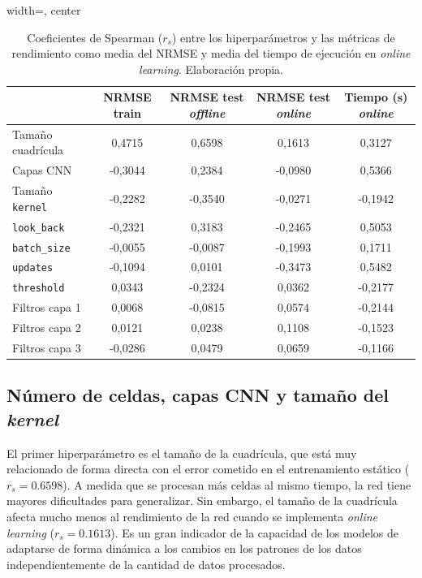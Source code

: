 \begin{table}[htbp]
	\centering
	\begin{adjustbox}{width=\textwidth, center}
		\begin{tabular}{l *{4}{c}}
			\toprule
			& NRMSE train & NRMSE test \textit{offline}  & NRMSE test \textit{online} & Tiempo (s) \textit{online} \\
			\midrule
			Tamaño cuadrícula         & 0,4715  & 0,6598  & 0,1613  & 0,3127  \\
			Capas CNN        & -0,3044 & 0,2384  & -0,0980 & 0,5366  \\
			Tamaño \texttt{kernel}          & -0,2282 & -0,3540 & -0,0271 & -0,1942 \\
			\texttt{look\_back}        & -0,2321 & 0,3183  & -0,2465 & 0,5053  \\
			\texttt{batch\_size}       & -0,0055 & -0,0087 & -0,1993 & 0,1711  \\
			\texttt{updates}         & -0,1094 & 0,0101  & -0,3473 & 0,5482  \\
			\texttt{threshold}       & 0,0343  & -0,2324 & 0,0362  & -0,2177 \\
			Filtros capa 1     & 0,0068  & -0,0815 & 0,0574  & -0,2144 \\
			Filtros capa 2     & 0,0121  & 0,0238  & 0,1108  & -0,1523 \\
			Filtros capa 3     & -0,0286 & 0,0479  & 0,0659  & -0,1166 \\
			\bottomrule
		\end{tabular}
	\end{adjustbox}
	\caption{Coeficientes de Spearman ($r_s$) entre los hiperparámetros y las métricas de rendimiento como media del NRMSE y media del tiempo de ejecución en \textit{online learning}. Elaboración propia.}
	\label{tab:Spearmancorrels}
\end{table}
\FloatBarrier

\subsection{Número de celdas, capas CNN y tamaño del \textit{kernel}}
El primer hiperparámetro es el tamaño de la cuadrícula, que está muy relacionado de forma directa con el error cometido en el entrenamiento estático ($r_s=0.6598$). A medida que se procesan más celdas al mismo tiempo, la red tiene mayores dificultades para generalizar. Sin embargo, el tamaño de la cuadrícula afecta mucho menos al rendimiento de la red cuando se implementa \textit{online learning} ($r_s=0.1613$). Es un gran indicador de la capacidad de los modelos de adaptarse de forma dinámica a los cambios en los patrones de los datos independientemente de la cantidad de datos procesados.

